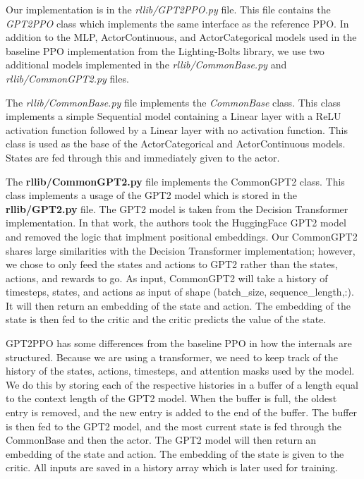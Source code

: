 \documentclass[conference]{IEEEtran}
\begin{document}
Our implementation is in the \textit{rllib/GPT2PPO.py} file. This file contains the \textit{GPT2PPO} class which implements the same interface as the reference PPO. In addition to the MLP, ActorContinuous, and ActorCategorical models used in the baseline PPO implementation from the Lighting-Bolts library, we use two additional models implemented in the \textit{rllib/CommonBase.py} and \textit{rllib/CommonGPT2.py} files.

The \textit{rllib/CommonBase.py} file implements the \textit{CommonBase} class. This class implements a simple Sequential model containing a Linear layer with a ReLU activation function followed by a Linear layer with no activation function. This class is used as the base of the ActorCategorical and ActorContinuous models. States are fed through this and immediately given to the actor.

The \textbf{rllib/CommonGPT2.py} file implements the CommonGPT2 class. This class implements a usage of the GPT2 model which is stored in the \textbf{rllib/GPT2.py} file. The GPT2 model is taken from the Decision Transformer implementation\cite{chen2021decision}. In that work, the authors took the HuggingFace GPT2 model and removed the logic that implment positional embeddings\cite{radford2019language,wolf2019huggingface}. Our CommonGPT2 shares large similarities with the Decision Transformer implementation\cite{chen2021decision}; however, we chose to only feed the states and actions to GPT2 rather than the states, actions, and rewards to go. As input, CommonGPT2 will take a history of timesteps, states, and actions as input of shape (batch\_size, sequence\_length,:). It will then return an embedding of the state and action. The embedding of the state is then fed to the critic and the critic predicts the value of the state.

GPT2PPO has some differences from the baseline PPO in how the internals are structured. Because we are using a transformer, we need to keep track of the history of the states, actions, timesteps, and attention masks used by the model. We do this by storing each of the respective histories in a buffer of a length equal to the context length of the GPT2 model. When the buffer is full, the oldest entry is removed, and the new entry is added to the end of the buffer. The buffer is then fed to the GPT2 model, and the most current state is fed through the CommonBase and then the actor. The GPT2 model will then return an embedding of the state and action. The embedding of the state is given to the critic. All inputs are saved in a history array which is later used for training.
\end{document}
